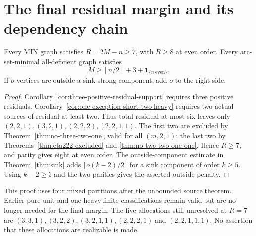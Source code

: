 \section{The final residual margin and its dependency chain}
\label{sec:supp-final-residual-margin}
\begin{theorem}\label{thm:supp-residual-seven}
Every MIN graph satisfies $R=2M-n\ge7$, with $R\ge8$ at even order.
Every arc-set-minimal all-deficient graph satisfies
\[
 M\ge\left\lceil n/2\right\rceil+3+\mathbf1_{\{n\text{ even}\}}.
\]
If $o$ vertices are outside a sink strong component, add $o$ to the right side.
\end{theorem}
\begin{proof}
Corollary~\ref{cor:three-positive-residual-support} requires three positive
residuals. Corollary~\ref{cor:one-exception-short-two-heavy} requires two
actual sources of residual at least two. Thus total residual at most six
leaves only $(2,2,1),(3,2,1),(2,2,2),(2,2,1,1)$.
The first two are excluded by Theorem~\ref{thm:no-three-two-one}, valid for
all $(m,2,1)$; the last two by Theorems~\ref{thm:eta222-excluded} and
\ref{thm:no-two-two-one-one}. Hence $R\ge7$, and parity gives eight at
even order. The outside-component estimate in Theorem~\ref{thm:sink} adds
$\lceil o(k-2)/2\rceil$ for a sink component of order $k\ge5$.
Using $k-2\ge3$ and the two parities gives the asserted outside penalty.
\end{proof}
This proof uses four mixed partitions after the unbounded source theorem.
Earlier pure-unit and one-heavy finite classifications remain valid but
are no longer needed for the final margin. The five allocations still
unresolved at $R=7$ are $(3,3,1),(3,2,2),(3,2,1,1),(2,2,2,1)$ and
$(2,2,1,1,1)$. No assertion that these allocations are realizable is made.
